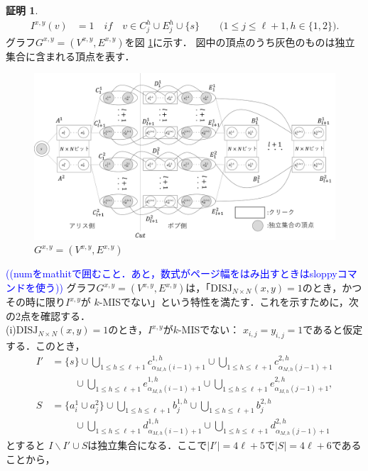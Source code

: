 \documentclass[12pt]{thesis}
\newcommand{\Izumi}[1]{\textcolor{blue}{(#1)}}
\theoremstyle{definition}
\newtheorem*{prf*}{証明}
\begin{document}
\begin{prf*}
\begin{align*}
I^{x,y}(v) &= 1 \quad if \quad v \in C^{h}_{j} \cup E^{h}_{j} \cup \{s\} \quad \quad \text{($1\leq j \leq \ell+1, h \in \{1, 2\}$)}.
\end{align*}
グラフ$G^{x, y} = (V^{x,y}, E^{x,y})$を図 \ref{k_G(x,y)}に示す．
図中の頂点のうち灰色のものは独立集合に含まれる頂点を表す．
\begin{figure}[ht]
\begin{center}
\includegraphics[width=120mm]{k_Gxy.png}
\end{center}
\caption{$G^{x, y} = (V^{x,y}, E^{x,y})$}
\label{k_G(x,y)}
\end{figure}
\Izumi{(numをmathitで囲むこと．あと，数式がページ幅をはみ出すときはsloppyコマンドを使う)}
グラフ$G^{x, y} = (V^{x,y}, E^{x,y})$は，「$\mathrm{DISJ}_{N \times N} (x, y) = 1$のとき，かつその時に限り$I^{x,y}$が
$k$-MISでない」という特性を満たす．これを示すために，次の2点を確認する． \\
(i)$\mathrm{DISJ}_{N \times N} (x, y) = 1$のとき，$I^{x,y}$が$k$-MISでない：
$x_{i,j}=y_{i,j}=1$であると仮定する．このとき，
\begin{align*}
I' &= \{s\} \cup \bigcup_{1\leq h \leq \ell+1}c^{1,h}_{\alpha_{M,h}(i-1)+1} \cup 
\bigcup_{1\leq h \leq \ell+1}c^{2,h}_{\alpha_{M,h}(j-1)+1} \\
&\phantom{=} \quad \cup 
\bigcup_{1\leq h \leq \ell+1}e^{1,h}_{\alpha_{M,h}(i-1)+1} 
\cup \bigcup_{1\leq h \leq \ell+1}e^{2,h}_{\alpha_{M,h}(j-1)+1}, \\
S &= \{a^{1}_{i} \cup a^{2}_{j}\} \cup 
\bigcup_{1\leq h \leq \ell+1}b^{1,h}_{j} \cup 
\bigcup_{1\leq h \leq \ell+1}b^{2,h}_{j} \\
&\phantom{=} \quad \cup 
\bigcup_{1\leq h \leq \ell+1}d^{1,h}_{\alpha_{M,h}(i-1)+1} \cup  
\bigcup_{1\leq h \leq \ell+1}d^{2,h}_{\alpha_{M,h}(j-1)+1}
\end{align*}
とすると
$I \backslash I' \cup S$は独立集合になる．ここで$|I'|=4\ell+5$で$|S|=4\ell+6$であることから，

\end{prf*}
\end{document}
